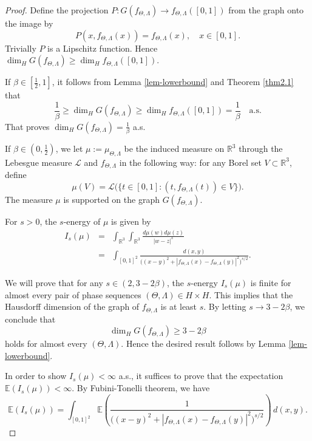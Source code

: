 \documentclass[10pt,a4paper]{amsart}
\begin{document}
\begin{proof} 
	Define the projection  $P: G(f_{\Theta,\Lambda}) \to f_{\Theta,\Lambda}([0,1])$ from the graph onto the image by 
	$$P(x, f_{\Theta,\Lambda}(x))= f_{\Theta,\Lambda}(x), \quad x\in [0,1].$$
	Trivially $P$ is a Lipschitz function.  Hence $\dim_H G(f_{\Theta,\Lambda})\ge \dim_H f_{\Theta,\Lambda}([0,1]).$
	
    If $\beta\in [\frac12, 1]$, 	it follows from  Lemma \ref{lem-lowerbound} and Theorem \ref{thm2.1} that
	$$ \frac {1}{\beta} \ge \dim_H G(f_{\Theta,\Lambda})\ge \dim_H f_{\Theta,\Lambda}([0,1])=\frac{1}{\beta} \quad \text{a.s.}$$
	That proves  $\dim_H G(f_{\Theta,\Lambda}) = \frac {1}{\beta}$ a.s.
	
	 If $\beta\in (0, \frac12)$,  we let   \( \mu:= \mu_{\Theta,\Lambda} \) be the induced measure on $\mathbb{R}^3$ through the Lebesgue measure  \( {\mathcal L} \) and $f_{\Theta,\Lambda}$ in the following way: for any Borel set \( V \subset \mathbb{R}^3 \), define
	\begin{equation*}
		\mu (V) = {\mathcal L}\bigl(\{t \in [0,1] : (t, f_{\Theta,\Lambda}(t)) \in V\}\bigr).
	\end{equation*} 
	The measure $\mu$ is supported on the graph  $G(f_{\Theta,\Lambda})$.  
	
	For $s>0$, the \(s\)-energy of \( \mu \)  is given by
	\begin{eqnarray*}
			I_s(\mu)
			&=& \int_{\mathbb{R}^3} \int_{\mathbb{R}^3}\frac{d\mu(w)d\mu(z)}{|w-z|^s} \\
			&=& \int_{[0,1]^2} \frac{d(x,y)}{\bigl((x-y)^2 + |f_{\Theta,\Lambda}(x)-f_{\Theta,\Lambda}(y)|^2\bigr)^{s/2}}.
	\end{eqnarray*}
	
	We will prove that for any \( s\in (2, 3-2\beta) \), the \(s\)-energy \( I_s(\mu) \) is finite for almost every pair of phase sequences \( (\Theta,\Lambda) \in H \times H \). This implies that the Hausdorff dimension of the graph of \( f_{\Theta,\Lambda} \) is at least \( s \). By letting \( s \to 3-2\beta \), we conclude that
	\[
	\dim_H G(f_{\Theta,\Lambda}) \ge 3-2\beta
	\]
	holds for almost every \( (\Theta,\Lambda) \). Hence the desired result follows by Lemma \ref{lem-lowerbound}.
	
	In order to show $I_s(\mu)<\infty $ a.s., it suffices to prove that the expectation \( \mathbb{E}(I_s(\mu)) < \infty \). By Fubini-Tonelli theorem, we have
	\begin{equation*}
		\mathbb{E}(I_s(\mu))= \int_{[0,1]^2} \mathbb{E}\left(\frac{1}{\bigl((x-y)^2 + |f_{\Theta,\Lambda}(x)-f_{\Theta,\Lambda}(y)|^2\bigr)^{s/2}}\right) \, d(x,y).
	\end{equation*}
	

\end{proof}
\end{document}
